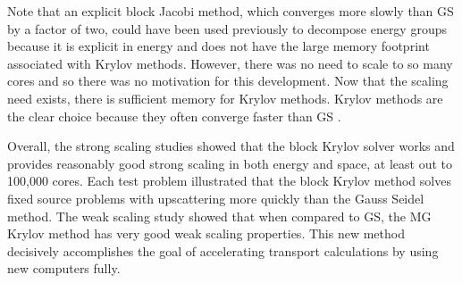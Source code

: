 Note that an explicit block Jacobi method, which converges more slowly than GS by a factor of two, could have been used previously to decompose energy groups because it is explicit in energy and does not have the large memory footprint associated with Krylov methods. However, there was no need to scale to so many cores and so there was no motivation for this development. Now that the scaling need exists, there is sufficient memory for Krylov methods. Krylov methods are the clear choice because they often converge faster than GS \cite{LeVeque2007}. 

Overall, the strong scaling studies showed that the block Krylov solver works and provides reasonably good strong scaling in both energy and space, at least out to 100,000 cores. Each test problem illustrated that the block Krylov method solves fixed source problems with upscattering more quickly than the Gauss Seidel method. The weak scaling study showed that when compared to GS, the MG Krylov method has very good weak scaling properties. This new method decisively accomplishes the goal of accelerating transport calculations by using new computers fully.

